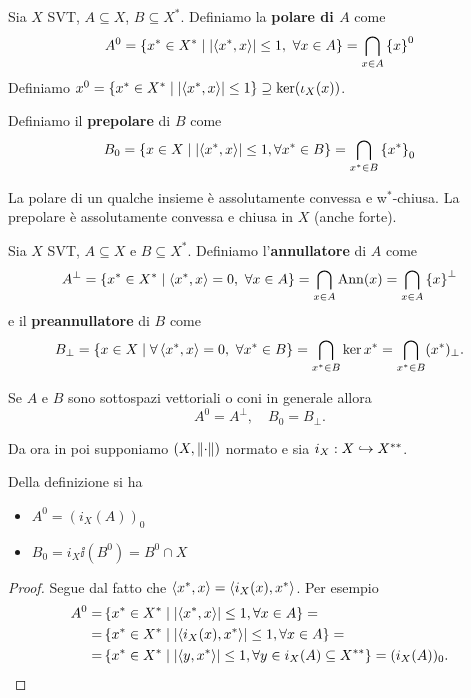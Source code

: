 \begin{definition}
Sia $X$ SVT, $A\subseteq X$, $B\subseteq X^\ast$. Definiamo la \textbf{polare di $A$} come
\[A^0=\left\{{x^\ast\in X^\ast\mid \left|{\left\langle {x^\ast,x}\right\rangle}\right|\leq 1,\ \forall x\in A}\right\}=\bigcap_{x\in A}\left\{{x}\right\}^0\]
Definiamo $x^0=\left\{{x^\ast\in X^\ast\mid \left|{\left\langle {x^\ast,x}\right\rangle}\right|\leq 1}\right\}\supseteq \ker(\iota_{X}(x))$.

Definiamo il \textbf{prepolare} di $B$ come
\[B_0=\left\{{x\in X\mid \left|{\left\langle {x^\ast,x}\right\rangle}\right|\leq 1,\forall x^\ast\in B}\right\}=\bigcap_{x^\ast\in B}\left\{{x^\ast}\right\}_0\]
\end{definition}

\begin{remark}
La polare di un qualche insieme \`e assolutamente convessa e w$^\ast$-chiusa. La prepolare \`e assolutamente convessa e chiusa in $X$ (anche forte).
\end{remark}

\begin{definition}
Sia $X$ SVT, $A\subseteq X$ e $B\subseteq X^\ast$. Definiamo l'\textbf{annullatore} di $A$ come
\[A^\perp=\left\{{x^\ast\in X^\ast\mid \left\langle {x^\ast,x}\right\rangle=0,\ \forall x\in A}\right\}=\bigcap_{x\in A}\operatorname{Ann}(x)=\bigcap_{x\in A}\left\{{x}\right\}^\perp\]
e il \textbf{preannullatore} di $B$ come
\[B_\perp=\left\{{x\in X\mid \forall \left\langle {x^\ast,x}\right\rangle=0,\ \forall x^\ast\in B}\right\}=\bigcap_{x^\ast\in B}\ker x^\ast=\bigcap_{x^\ast\in B}(x^\ast)_\perp.\]
\end{definition}

\begin{remark}
Se $A$ e $B$ sono sottospazi vettoriali o coni in generale allora
\[A^0=A^\perp,\quad B_0=B_\perp.\]
\end{remark}

Da ora in poi supponiamo $(X,\left\Vert{\cdot}\right\Vert)$ normato e sia $i_X:X\hookrightarrow X^{\ast\ast}$. 

\begin{proposition}\label{PrPolareEPrepolareInNormato}
Della definizione si ha
\begin{itemize}
    \item $A^0=(i_X(A))_0$
    \item $B_0=i_X\ii(B^0)=B^0\cap X$
\end{itemize}
\end{proposition}
\begin{proof}
Segue dal fatto che $\left\langle {x^\ast,x}\right\rangle=\left\langle {i_X(x),x^\ast}\right\rangle$. Per esempio
\begin{align*}
    A^0=&\left\{{x^\ast\in X^\ast\mid \left|{\left\langle {x^\ast,x}\right\rangle}\right|\leq 1, \forall x\in A}\right\}=\\
    =&\left\{{x^\ast\in X^\ast\mid \left|{\left\langle {i_X(x),x^\ast}\right\rangle}\right|\leq 1, \forall x\in A}\right\}=\\
    =&\left\{{x^\ast\in X^\ast\mid \left|{\left\langle {y,x^\ast}\right\rangle}\right|\leq 1, \forall y\in i_X(A)\subseteq X^{\ast\ast}}\right\}=(i_X(A))_0.
\end{align*}
\end{proof}

